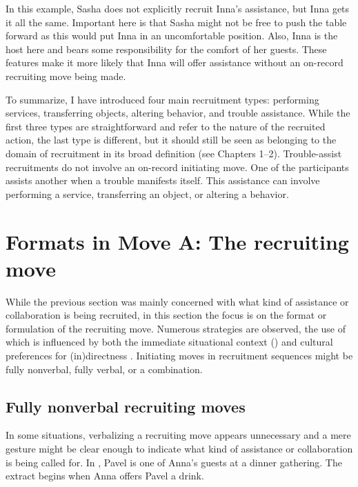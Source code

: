 \documentclass[output=paper,modfonts,nonflat]{langsci/langscibook}
\begin{document}
In this example, Sasha does not explicitly recruit Inna’s assistance, but Inna gets it all the same. Important here is that Sasha might not be free to push the table forward as this would put Inna in an uncomfortable position. Also, Inna is the host here and bears some responsibility for the comfort of her guests. These features make it more likely that Inna will offer assistance without an on-record recruiting move being made.

To summarize, I have introduced four main recruitment types: performing services, transferring objects, altering behavior, and trouble assistance. While the first three types are straightforward and refer to the nature of the recruited action, the last type is different, but it should still be seen as belonging to the domain of recruitment in its broad definition (see Chapters 1--2). Trouble-assist recruitments do not involve an on-record initiating move. One of the participants assists another when a trouble manifests itself. This assistance can involve performing a service, transferring an object, or altering a behavior.

\section{Formats in Move A: The recruiting move}

While the previous section was mainly concerned with what kind of assistance or collaboration is being recruited, in this section the focus is on the format or formulation of the recruiting move. Numerous strategies are observed, the use of which is influenced by both the immediate situational context (\citealt{Rossi2015a}) and cultural preferences for (in)directness \citep{Ogiermann2009,bolden2017}. Initiating moves in recruitment sequences might be fully nonverbal, fully verbal, or a combination.

\subsection{Fully nonverbal recruiting moves}\label{sec:baranova:3.1}

In some situations, verbalizing a recruiting move appears unnecessary and a mere gesture might be clear enough to indicate what kind of assistance or collaboration is being called for. In , Pavel is one of Anna's guests at a dinner gathering. The extract begins when Anna offers Pavel a drink.
\end{document}
